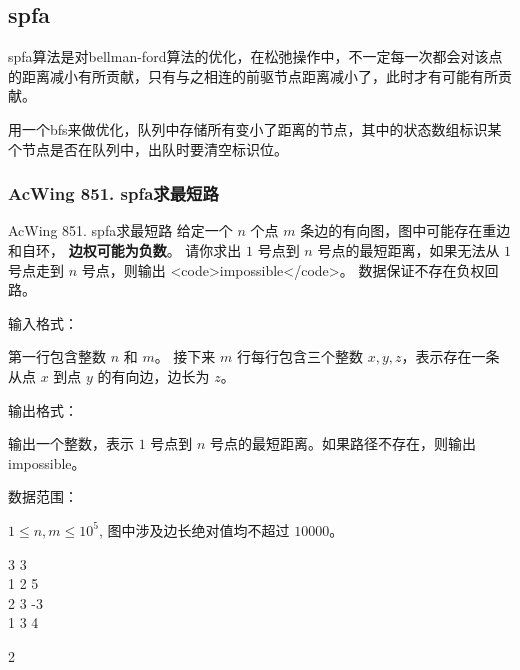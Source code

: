 \subsection{spfa}
spfa算法是对bellman-ford算法的优化，在松弛操作中，不一定每一次都会对该点的距离减小有所贡献，只有与之相连的前驱节点距离减小了，此时才有可能有所贡献。

用一个bfs来做优化，队列中存储所有变小了距离的节点，其中的状态数组标识某个节点是否在队列中，出队时要清空标识位。

\subsubsection{AcWing 851. spfa求最短路}

\begin{titledbox}{AcWing 851. spfa求最短路}
    给定一个 $n$ 个点 $m$ 条边的有向图，图中可能存在重边和自环， \textbf{边权可能为负数}。 请你求出 $1$ 号点到 $n$ 号点的最短距离，如果无法从 $1$ 号点走到 $n$ 号点，则输出 <code>impossible</code>。
    数据保证不存在负权回路。

    输入格式：

    第一行包含整数 $n$ 和 $m$。 接下来 $m$ 行每行包含三个整数 $x,y,z$，表示存在一条从点 $x$ 到点 $y$ 的有向边，边长为 $z$。

    输出格式：

    输出一个整数，表示 $1$ 号点到 $n$ 号点的最短距离。如果路径不存在，则输出 impossible。

    数据范围：

    $1 \le n,m \le 10^5$, 图中涉及边长绝对值均不超过 $10000$。

    \begin{inputblock}
        3 3 \\
        1 2 5 \\
        2 3 -3 \\
        1 3 4
    \end{inputblock}
    \begin{outputblock}
        2
    \end{outputblock}
\end{titledbox}

